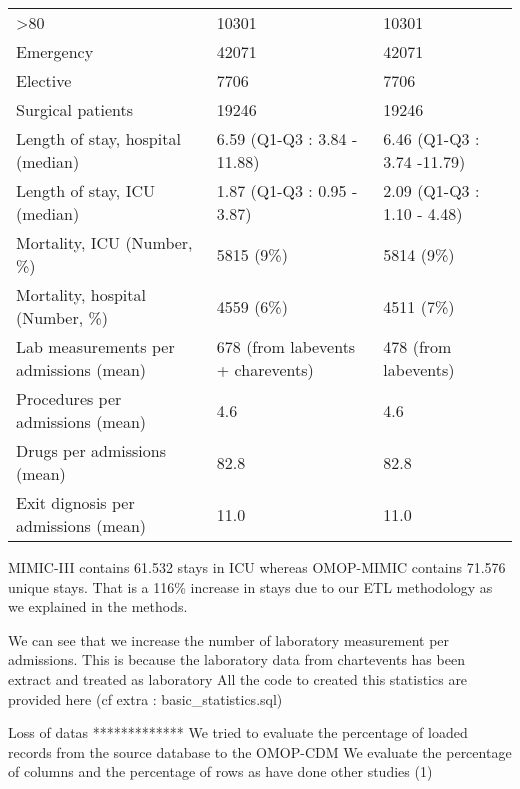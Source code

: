 \begin{table}[]
\begin{tabular}{lll}
\textgreater{}80                       & 10301                              & 10301                      \\
Emergency                              & 42071                              & 42071                      \\
Elective                               & 7706                               & 7706                       \\
Surgical patients                      & 19246                              & 19246                      \\
Length of stay, hospital (median)      & 6.59 (Q1-Q3 : 3.84 - 11.88)        & 6.46 (Q1-Q3 : 3.74 -11.79) \\
Length of stay, ICU (median)           & 1.87 (Q1-Q3 : 0.95 - 3.87)         & 2.09 (Q1-Q3 : 1.10 - 4.48) \\
Mortality, ICU (Number, \%)            & 5815 (9\%)                         & 5814 (9\%)                 \\
Mortality, hospital (Number, \%)       & 4559 (6\%)                         & 4511 (7\%)                 \\
Lab measurements per admissions (mean) & 678  (from labevents + charevents) & 478 (from labevents)       \\
Procedures per admissions (mean)       & 4.6                                & 4.6                        \\
Drugs per admissions (mean)            & 82.8                               & 82.8                       \\
Exit dignosis per admissions (mean)    & 11.0                               & 11.0                      
\end{tabular}
\end{table}

MIMIC-III contains 61.532 stays in ICU whereas OMOP-MIMIC contains 71.576 unique stays.
That is a 116\% increase in stays due to our ETL methodology as we explained in the methods.

We can see that we increase the number of laboratory measurement per admissions.
This is because the laboratory data from chartevents has been extract and treated as laboratory
All the code to created this statistics are provided here (cf extra : basic_statistics.sql)

Loss of datas
*************
We tried to evaluate the percentage of loaded records from the source database to the OMOP-CDM
We evaluate the percentage of columns and the percentage of rows as have done other studies (1) 

